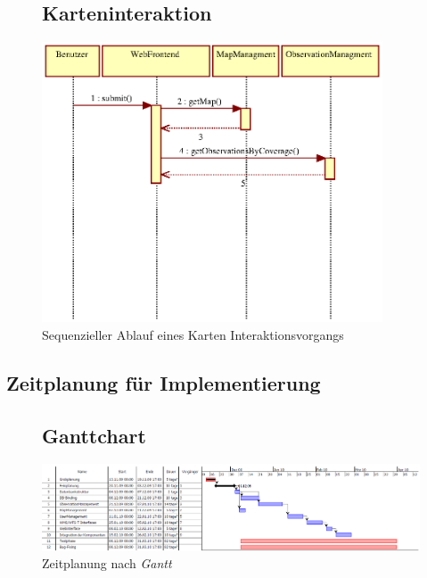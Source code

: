 \documentclass[a4paper,11pt]{scrartcl}
\begin{document}
\begin{figure}[htbp]
\subsection{Karteninteraktion}
		\centering
		\includegraphics[width=0.90\textwidth]{images/seq15_KartenInteraktion.eps}
		\caption{Sequenzieller Ablauf eines Karten Interaktionsvorgangs}
		\label{seq15}
\end{figure}

\newpage
\begin{samepage}
\begin{landscape}
\section{Zeitplanung für Implementierung}
\begin{figure}[htbp]
\subsection{Ganttchart}
		\centering
		\includegraphics[width=1.3\textwidth]{images/ganttchart.png}
		\caption{Zeitplanung nach \emph{Gantt}}
		\label{ganttchart}
\end{figure}
\end{landscape}
\end{samepage}
\end{document}
